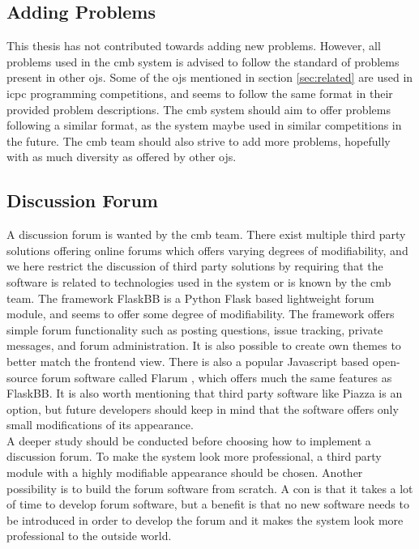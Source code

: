 \subsection{Adding Problems}
This thesis has not contributed towards adding new problems. However, all problems used in the \gls{cmb} system is advised to follow the standard of problems present in other \glspl{oj}. Some of the \glspl{oj} mentioned in section \ref{sec:related} are used in \gls{icpc} programming competitions, and seems to follow the same format in their provided problem descriptions. The \gls{cmb} system should aim to offer problems following a similar format, as the system maybe used in similar competitions in the future. The \gls{cmb} team should also strive to add more problems, hopefully with as much diversity as offered by other \glspl{oj}.

\subsection{Discussion Forum}
A discussion forum is wanted by the \gls{cmb} team. There exist multiple third party solutions offering online forums which offers varying degrees of modifiability, and we here restrict the discussion of third party solutions by requiring that the software is related to technologies used in the system or is known by the \gls{cmb} team. The framework FlaskBB \cite{FLASKBB} is a Python Flask based lightweight forum module, and seems to offer some degree of modifiability. The framework offers simple forum functionality such as posting questions, issue tracking, private messages, and forum administration. It is also possible to create own themes to better match the frontend view. There is also a popular Javascript based open-source forum software called Flarum \cite{FLARUM}, which offers much the same features as FlaskBB. It is also worth mentioning that third party software like Piazza is an option, but future developers should keep in mind that the software offers only small modifications of its appearance. \\

A deeper study should be conducted before choosing how to implement a discussion forum. To make the system look more professional, a third party module with a highly modifiable appearance should be chosen. Another possibility is to build the forum software from scratch. A con is that it takes a lot of time to develop forum software, but a benefit is that no new software needs to be introduced in order to develop the forum and it makes the system look more professional to the outside world.
